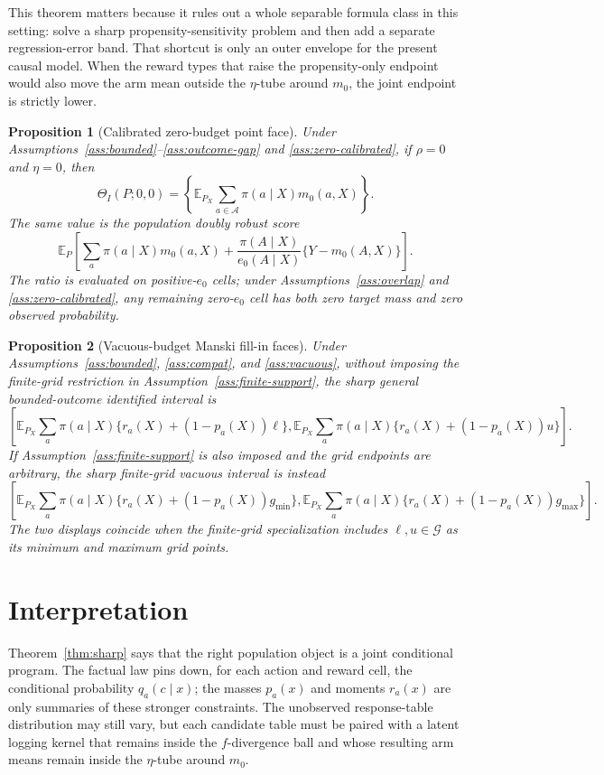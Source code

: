\documentclass[11pt]{article}
\newcommand{\E}{\mathbb{E}}
\theoremstyle{definition}
\theoremstyle{plain}
\newtheorem{proposition}{Proposition}
\theoremstyle{remark}
\begin{document}
This theorem matters because it rules out a whole separable formula class in
this setting: solve a sharp propensity-sensitivity problem and then add a
separate regression-error band.  That shortcut is only an outer envelope for
the present causal model.  When the reward types that raise the propensity-only
endpoint would also move the arm mean outside the $\eta$-tube around $m_0$, the
joint endpoint is strictly lower.

\begin{proposition}[Calibrated zero-budget point face]\label{prop:dr-corner}
Under Assumptions~\ref{ass:bounded}--\ref{ass:outcome-gap} and
\ref{ass:zero-calibrated}, if $\rho=0$ and $\eta=0$, then
\[
  \Theta_I(P;0,0)
  =\left\{\E_{P_X}\sum_{a\in\mathcal A}\pi(a\mid X)m_0(a,X)\right\}.
\]
The same value is the population doubly robust score
\[
  \E_P\left[
    \sum_a\pi(a\mid X)m_0(a,X)
    +\frac{\pi(A\mid X)}{e_0(A\mid X)}\{Y-m_0(A,X)\}
  \right].
\]
The ratio is evaluated on positive-$e_0$ cells; under
Assumptions~\ref{ass:overlap} and \ref{ass:zero-calibrated}, any remaining
zero-$e_0$ cell has both zero target mass and zero observed probability.
\end{proposition}

\begin{proposition}[Vacuous-budget Manski fill-in faces]\label{prop:manski}
Under Assumptions~\ref{ass:bounded}, \ref{ass:compat}, and \ref{ass:vacuous},
without imposing the finite-grid restriction in Assumption~\ref{ass:finite-support},
the sharp general bounded-outcome identified interval is
\[
  \left[
  \E_{P_X}\sum_a\pi(a\mid X)\{r_a(X)+(1-p_a(X))\ell\},
  \E_{P_X}\sum_a\pi(a\mid X)\{r_a(X)+(1-p_a(X))u\}
  \right].
\]
If Assumption~\ref{ass:finite-support} is also imposed and the grid endpoints
are arbitrary, the sharp finite-grid vacuous interval is instead
\[
  \left[
  \E_{P_X}\sum_a\pi(a\mid X)\{r_a(X)+(1-p_a(X))g_{\min}\},
  \E_{P_X}\sum_a\pi(a\mid X)\{r_a(X)+(1-p_a(X))g_{\max}\}
  \right].
\]
The two displays coincide when the finite-grid specialization includes
$\ell,u\in\mathcal G$ as its minimum and maximum grid points.
\end{proposition}

\section{Interpretation}
Theorem~\ref{thm:sharp} says that the right population object is a joint
conditional program.  The factual law pins down, for each action and reward
cell, the conditional probability $q_a(c\mid x)$; the masses $p_a(x)$ and
moments $r_a(x)$ are only summaries of these stronger constraints.  The
unobserved response-table distribution may still vary, but each candidate table
must be paired with a latent logging kernel that remains inside the
$f$-divergence ball and whose resulting arm means remain inside the
$\eta$-tube around $m_0$.
\end{document}
